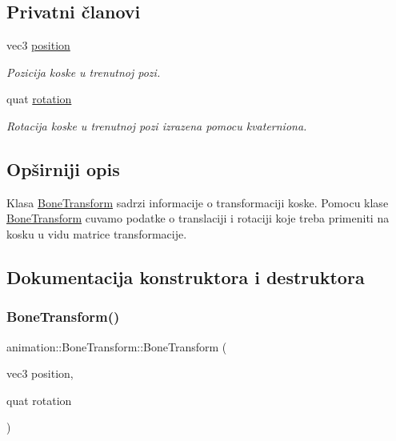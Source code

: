 \subsection*{Privatni članovi}
\begin{DoxyCompactItemize}
\item 
vec3 \hyperlink{classanimation_1_1BoneTransform_acb46d77828eabe58da347d94dbf7198e}{position}
\begin{DoxyCompactList}\small\item\em Pozicija koske u trenutnoj pozi. \end{DoxyCompactList}\item 
quat \hyperlink{classanimation_1_1BoneTransform_a3e8c723b186841dcc21d5548944d243b}{rotation}
\begin{DoxyCompactList}\small\item\em Rotacija koske u trenutnoj pozi izrazena pomocu kvaterniona. \end{DoxyCompactList}\end{DoxyCompactItemize}


\subsection{Opširniji opis}
Klasa \hyperlink{classanimation_1_1BoneTransform}{Bone\+Transform} sadrzi informacije o transformaciji koske. Pomocu klase \hyperlink{classanimation_1_1BoneTransform}{Bone\+Transform} cuvamo podatke o translaciji i rotaciji koje treba primeniti na kosku u vidu matrice transformacije. 

\subsection{Dokumentacija konstruktora i destruktora}
\mbox{\label{classanimation_1_1BoneTransform_aaed7954137aada7aec413b64664f0e98}} 
\subsubsection{\texorpdfstring{Bone\+Transform()}{BoneTransform()}}
{\footnotesize\ttfamily animation\+::\+Bone\+Transform\+::\+Bone\+Transform (\begin{DoxyParamCaption}\item[{vec3}]{position,  }\item[{quat}]{rotation }\end{DoxyParamCaption})}




